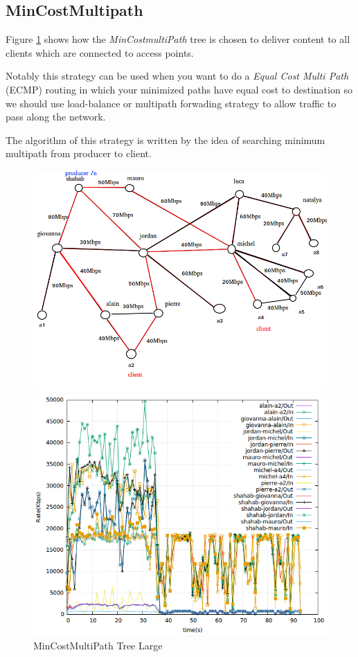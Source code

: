 \subsection{MinCostMultipath}
Figure \ref{MinCostMultiPath} shows how the \textit{MinCostmultiPath} tree is chosen to deliver content to all clients which are connected to access points.
 
Notably this strategy can be used when you want to do a \textit{Equal Cost Multi Path} (ECMP) routing in which your minimized paths have equal cost to destination so we should use load-balance or multipath forwading strategy to allow traffic to pass along the network. 

The algorithm of this strategy is written by the idea of searching minimum multipath from producer to client.

\begin{figure}[H]

\begin{center}

\includegraphics[scale = 0.4]{Figures/MinCostMultipath_big.png}

\caption{MinCostMultiPath Tree Large} \label{MinCostMultiPath} 


\includegraphics[scale = 0.4]{Figures/mincostmultipath_big.png}


\end{center}
\end{figure}
